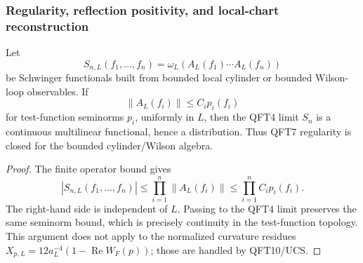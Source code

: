 \documentclass[12pt,a4paper]{article}
\begin{document}
\subsubsection{Regularity, reflection positivity, and local-chart reconstruction}
\label{p12:sec:regularity-positivity-local-chart}

\begin{lemma}
\label{p12:lem:bounded-cylinder-regularity}
Let
\[
S_{n,L}(f_1,\ldots,f_n)=\omega_L(A_L(f_1)\cdots A_L(f_n))
\]
be Schwinger functionals built from bounded local cylinder or bounded Wilson-loop observables.  If
\[
\|A_L(f_i)\|\le C_i p_i(f_i)
\]
for test-function seminorms \(p_i\), uniformly in \(L\), then the QFT4 limit \(S_n\) is a continuous multilinear functional, hence a distribution.  Thus QFT7 regularity is closed for the bounded cylinder/Wilson algebra.
\end{lemma}
\begin{proof}
The finite operator bound gives
\[
|S_{n,L}(f_1,\ldots,f_n)|
\le
\prod_{i=1}^n \|A_L(f_i)\|
\le
\prod_{i=1}^n C_i p_i(f_i).
\]
The right-hand side is independent of \(L\).  Passing to the QFT4 limit preserves the same seminorm bound, which is precisely continuity in the test-function topology.  This argument does not apply to the normalized curvature residues \(X_{p,L}=12a_L^{-4}(1-\operatorname{Re}W_F(p))\); those are handled by QFT10/UCS.
\end{proof}
\end{document}
